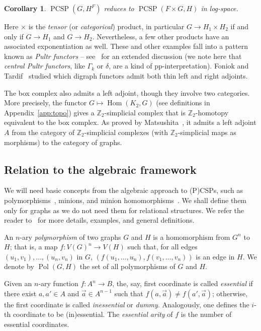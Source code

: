 \documentclass[11pt,a4paper]{scrartcl}
\numberwithin{theorem}{section}
\newtheorem{corollary}[theorem]{Corollary}
\theoremstyle{definition}
\newcommand{\ZZ}{\mathbb{Z}}
\DeclareMathOperator{\PCSP}{PCSP}
\DeclareMathOperator{\Pol}{Pol}
\DeclareMathOperator{\Hom}{Hom}
\begin{document}
\begin{corollary}
	$\PCSP(G, H^F)$ reduces to $\PCSP(F \times G, H)$ in log-space.
\end{corollary}

Here $\times$ is the \emph{tensor} (or \emph{categorical}) product,
in particular $G \to H_1 \times H_2$ if and only if $G \to H_1$ and $G \to H_2$.
Nevertheless, a few other products have an associated exponentiation as well.
These and other examples fall into a pattern known as \emph{Pultr functors} -- see~\cite{FoniokT13} for an extended discussion (we note here that \emph{central Pultr functors}, like $\Gamma_k$ or $\delta$, are a kind of pp-interpretation).
Foniok and Tardif~\cite{FoniokT15} studied which digraph functors admit both thin left and right adjoints.

The box complex also admits a left adjoint, though they involve two categories.
More precisely, the functor $G \mapsto \Hom(K_2, G)$ (see definitions in Appendix~\ref{app:topo})
gives a $\ZZ_2$-simplicial complex that is $\ZZ_2$-homotopy equivalent to the box complex.
As proved by Matsushita~\cite{Matsushita17}, it admits a left adjoint $A$ from the category of $\ZZ_2$-simplicial complexes (with $\ZZ_2$-simplicial maps as morphisms) to the category of graphs.

\subsection{Relation to the algebraic framework}\label{subsec:category}

We will need basic concepts from the algebraic approach to (P)CSPs, such as
polymorphisms~\cite{Austrin17:sicomp,Brakensiek18:soda}, minions, and minion
homomorphisms~\cite{BulinKO18}. We shall define them only for graphs as we do
not need them for relational structures. We refer the reader
to~\cite{bkw17:survey,BulinKO18} for more details, examples, and general
definitions.

An $n$-ary \emph{polymorphism} of two graphs $G$ and $H$ is a homomorphism from
$G^n$ to $H$; that is, a map $f:V(G)^n\to V(H)$ such that, for all edges
$(u_1,v_1),\ldots,(u_n,v_n)$ in $G$,
$(f(u_1,\ldots,u_n),f(v_1,\ldots,v_n))$ is an edge in $H$. We denote by
$\Pol(G,H)$ the set of all polymorphisms of $G$ and $H$.

Given an $n$-ary function $f:A^n\to B$, the, say, first coordinate is called
\emph{essential} if there exist $a,a'\in A$ and $\vec{a}\in A^{n-1}$ such that
$f(a,\vec{a})\neq f(a',\vec{a})$; otherwise, the first coordinate is called
\emph{inessential} or \emph{dummy}. Analogously, one defines the $i$-th
coordinate to be (in)essential.
The \emph{essential arity} of $f$ is the number of essential coordinates.
\end{document}
